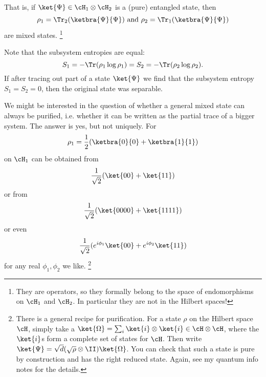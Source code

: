 That is, if $\ket{\Psi} \in \cH_1 \otimes \cH_2$ is a (pure) entangled state, then
\begin{equation}
    \rho_1 = \Tr_2(\ketbra{\Psi}{\Psi}) \text{ and } \rho_2 = \Tr_1(\ketbra{\Psi}{\Psi})
\end{equation}
are mixed states.%
    \footnote{They are operators, so they formally belong to the space of endomorphisms on $\cH_1$ and $\cH_2$. In particular they are not in the Hilbert spaces!}

Note that the subsystem entropies are equal:
\begin{equation}
    S_1 = -\Tr(\rho_1 \log \rho_1) = S_2 = -\Tr(\rho_2 \log \rho_2).
\end{equation}
If after tracing out part of a state $\ket{\Psi}$ we find that the subsystem entropy $S_1=S_2=0$, then the original state was separable.

We might be interested in the question of whether a general mixed state can always be purified, i.e. whether it can be written as the partial trace of a bigger system. The answer is yes, but not uniquely. For
\begin{equation}
    \rho_1 = \frac{1}{2}(\ketbra{0}{0} + \ketbra{1}{1})
\end{equation}
on $\cH_1$ can be obtained from
\begin{equation}
    \frac{1}{\sqrt{2}}(\ket{00} + \ket{11})
\end{equation}
or from
\begin{equation}
    \frac{1}{\sqrt{2}}(\ket{0000} + \ket{1111})
\end{equation}
or even
\begin{equation}
    \frac{1}{\sqrt{2}}(e^{i\phi_1} \ket{00} + e^{i\phi_2} \ket{11})
\end{equation}
for any real $\phi_1,\phi_2$ we like.%
    \footnote{There is a general recipe for purification. For a state $\rho$ on the Hilbert space $\cH$, simply take a  $\ket{\Omega} = \sum_i \ket{i}\otimes\ket{i} \in \cH \otimes \cH$, where the $\ket{i}$s form a complete set of states for $\cH$. Then write $\ket{\Psi} = \sqrt{d}(\sqrt{\rho} \otimes \II)\ket{\Omega}$. You can check that such a state is pure by construction and has the right reduced state. Again, see my quantum info notes for the details.}

